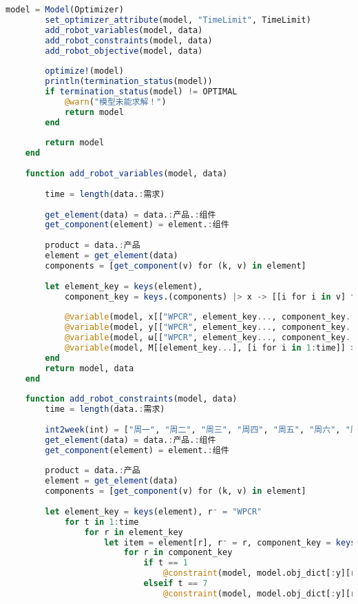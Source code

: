 \begin{appendices}
\begin{lstlisting}[language=julia]
        model = Model(Optimizer)
        set_optimizer_attribute(model, "TimeLimit", TimeLimit)
        add_robot_variables(model, data)
        add_robot_constraints(model, data)
        add_robot_objective(model, data)
    
        optimize!(model)
        println(termination_status(model))
        if termination_status(model) != OPTIMAL
            @warn("模型未能求解！")
            return model
        end
    
        return model
    end
    
    function add_robot_variables(model, data)
    
        time = length(data.:需求)
    
        get_element(data) = data.:产品.:组件
        get_component(element) = element.:组件
    
        product = data.:产品
        element = get_element(data)
        components = [get_component(v) for (k, v) in element]
    
        let element_key = keys(element),
            component_key = keys.(components) |> x -> [[i for i in v] for v in x] |> x -> vcat(x...)
    
            @variable(model, x[["WPCR", element_key..., component_key...], [i for i in 1:time]] >= 0, Int)
            @variable(model, y[["WPCR", element_key..., component_key...], [i for i in 1:time]] >= 0, Int)
            @variable(model, ω[["WPCR", element_key..., component_key...], [i for i in 1:time]], Bin)
            @variable(model, M[[element_key...], [i for i in 1:time]] >= 0, Int)
        end
        return model, data
    end
    
    function add_robot_constraints(model, data)
        time = length(data.:需求)
    
        int2week(int) = ["周一", "周二", "周三", "周四", "周五", "周六", "周日"][int]
        get_element(data) = data.:产品.:组件
        get_component(element) = element.:组件
    
        product = data.:产品
        element = get_element(data)
        components = [get_component(v) for (k, v) in element]
    
        let element_key = keys(element), r⁻ = "WPCR"
            for t in 1:time
                for r in element_key
                    let item = element[r], r⁻ = r, component_key = keys(item.:组件)
                        for r in component_key
                            if t == 1
                                @constraint(model, model.obj_dict[:y][r, t] == 0 + model.obj_dict[:x][r, t] - item.:需求量[r] * model.obj_dict[:x][r⁻, t])
                            elseif t == 7
                                @constraint(model, model.obj_dict[:y][r, t] == model.obj_dict[:y][r, t-1] + model.obj_dict[:x][r, t] - item.:需求量[r] * model.obj_dict[:x][r⁻, t])
    

\end{lstlisting}
\end{appendices}

